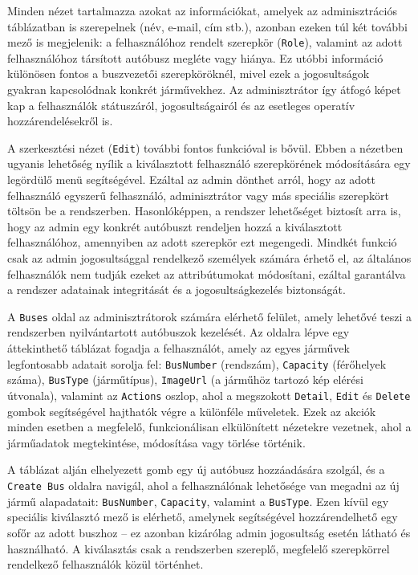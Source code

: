 Minden nézet tartalmazza azokat az információkat, amelyek az adminisztrációs táblázatban is szerepelnek (név, e-mail, cím stb.), azonban ezeken túl két további mező is megjelenik: a felhasználóhoz rendelt szerepkör (\texttt{Role}), valamint az adott felhasználóhoz társított autóbusz megléte vagy hiánya. Ez utóbbi információ különösen fontos a buszvezetői szerepköröknél, mivel ezek a jogosultságok gyakran kapcsolódnak konkrét járművekhez. Az adminisztrátor így átfogó képet kap a felhasználók státuszáról, jogosultságairól és az esetleges operatív hozzárendelésekről is.

A szerkesztési nézet (\texttt{Edit}) további fontos funkcióval is bővül. Ebben a nézetben ugyanis lehetőség nyílik a kiválasztott felhasználó szerepkörének módosítására egy legördülő menü segítségével. Ezáltal az admin dönthet arról, hogy az adott felhasználó egyszerű felhasználó, adminisztrátor vagy más speciális szerepkört töltsön be a rendszerben. Hasonlóképpen, a rendszer lehetőséget biztosít arra is, hogy az admin egy konkrét autóbuszt rendeljen hozzá a kiválasztott felhasználóhoz, amennyiben az adott szerepkör ezt megengedi. Mindkét funkció csak az admin jogosultsággal rendelkező személyek számára érhető el, az általános felhasználók nem tudják ezeket az attribútumokat módosítani, ezáltal garantálva a rendszer adatainak integritását és a jogosultságkezelés biztonságát.

A \texttt{Buses} oldal az adminisztrátorok számára elérhető felület, amely lehetővé teszi a rendszerben nyilvántartott autóbuszok kezelését. Az oldalra lépve egy áttekinthető táblázat fogadja a felhasználót, amely az egyes járművek legfontosabb adatait sorolja fel: \texttt{BusNumber} (rendszám), \texttt{Capacity} (férőhelyek száma), \texttt{BusType} (járműtípus), \texttt{ImageUrl} (a járműhöz tartozó kép elérési útvonala), valamint az \texttt{Actions} oszlop, ahol a megszokott \texttt{Detail}, \texttt{Edit} és \texttt{Delete} gombok segítségével hajthatók végre a különféle műveletek. Ezek az akciók minden esetben a megfelelő, funkcionálisan elkülönített nézetekre vezetnek, ahol a járműadatok megtekintése, módosítása vagy törlése történik.

A táblázat alján elhelyezett gomb egy új autóbusz hozzáadására szolgál, és a \texttt{Create Bus} oldalra navigál, ahol a felhasználónak lehetősége van megadni az új jármű alapadatait: \texttt{BusNumber}, \texttt{Capacity}, valamint a \texttt{BusType}. Ezen kívül egy speciális kiválasztó mező is elérhető, amelynek segítségével hozzárendelhető egy sofőr az adott buszhoz – ez azonban kizárólag admin jogosultság esetén látható és használható. A kiválasztás csak a rendszerben szereplő, megfelelő szerepkörrel rendelkező felhasználók közül történhet.

